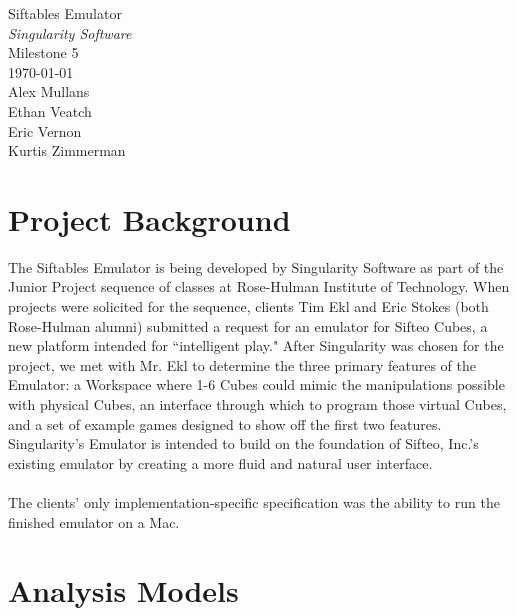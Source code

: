\documentclass[12pt]{article}
\begin{document}
\vspace*{\fill}
        \begin{center}
                \LARGE{Siftables Emulator} \\
                \LARGE{\textit{Singularity Software}} \\
                Milestone 5 \\
                \vspace{.15in}
                \large{\today} \\
                \vspace{4in}
                        Alex Mullans \\
                        Ethan Veatch \\
                        Eric Vernon \\
                        Kurtis Zimmerman
        \end{center}
\vspace*{\fill}
\thispagestyle{empty}

\clearpage

\tableofcontents

\clearpage

\section{Project Background}
The Siftables Emulator is being developed by Singularity Software as part of the Junior Project sequence of classes at Rose-Hulman Institute of Technology. When projects were solicited for the sequence, clients Tim Ekl and Eric Stokes (both Rose-Hulman alumni) submitted a request for an emulator for Sifteo Cubes, a new platform intended for ``intelligent play." After Singularity was chosen for the project, we met with Mr. Ekl to determine the three primary features of the Emulator: a Workspace where 1-6 Cubes could mimic the manipulations possible with physical Cubes, an interface through which to program those virtual Cubes, and a set of example games designed to show off the first two features. Singularity's Emulator is intended to build on the foundation of Sifteo, Inc.'s existing emulator by creating a more fluid and natural user interface.
 \\\\
The clients' only implementation-specific specification was the ability to run the finished emulator on a Mac.

\clearpage

\section{Analysis Models}
\end{document}
